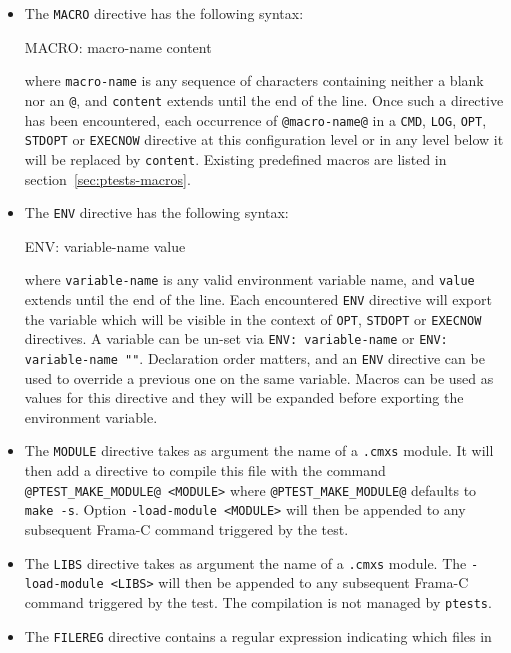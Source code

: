 \begin{itemize}
\item The \texttt{MACRO} directive
  has the following syntax:
  \begin{code}
    MACRO: macro-name content
  \end{code}
  where \texttt{macro-name} is any sequence of characters containing neither
  a blank nor an \texttt{@}, and \texttt{content} extends until the end of the
  line. Once such a directive has been encountered, each occurrence of
  \texttt{@macro-name@} in a \texttt{CMD}, \texttt{LOG}, \texttt{OPT},
  \texttt{STDOPT} or \texttt{EXECNOW} directive at this configuration level
  or in any level below it will be replaced by \texttt{content}. Existing
  predefined macros are listed in section~\ref{sec:ptests-macros}.
\item The \texttt{ENV} directive
  has the following syntax:
  \begin{code}
    ENV: variable-name value
  \end{code}
  where \texttt{variable-name} is any valid environment variable name, and
  \texttt{value} extends until the end of the line. Each encountered
  \texttt{ENV} directive will export the variable which will be visible in the
  context of \texttt{OPT}, \texttt{STDOPT} or \texttt{EXECNOW} directives. A
  variable can be un-set via \texttt{ENV: variable-name} or \texttt{ENV:
  variable-name ""}. Declaration order matters, and an \texttt{ENV} directive
  can be used to override a previous one on the same variable. Macros can be
  used as values for this directive and they will be expanded before exporting
  the environment variable.
\item The \texttt{MODULE}
 directive takes as argument the name of a \texttt{.cmxs}
  module. It will then add a directive to compile this file with the
  command \texttt{@PTEST\_MAKE\_MODULE@ <MODULE>} where
  \texttt{@PTEST\_MAKE\_MODULE@} defaults to \texttt{make -s}. Option
  \texttt{-load-module <MODULE>} will then be appended to any subsequent Frama-C
  command triggered by the test.
\item The \texttt{LIBS}
 directive takes as argument the name of a \texttt{.cmxs}
  module. The \texttt{-load-module <LIBS>} will then be appended to any subsequent Frama-C command triggered by the test. The compilation is not managed by \texttt{ptests}.
\item The \texttt{FILEREG}
  directive contains a regular expression indicating which files in

\end{itemize}

